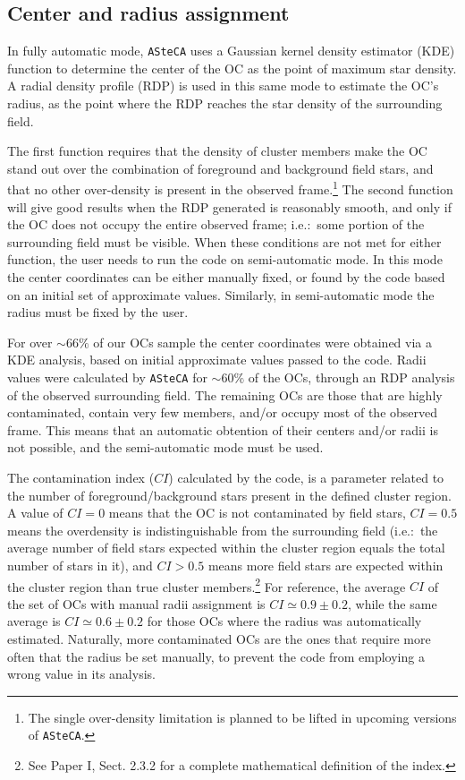 \documentclass{aa}
\begin{document}
\subsection{Center and radius assignment}
\label{ssec:centre-radius}

In fully automatic mode, \texttt{ASteCA} uses a Gaussian kernel density
estimator (KDE) function to determine the center of the OC as the point of
maximum star density.
A radial density profile (RDP) is used in this same mode to estimate
the OC's radius, as the point where the RDP reaches the star density of the
surrounding field.

The first function requires that the density of cluster members make the
OC stand out over the combination of foreground and background field stars, and
that no other over-density is present in the observed frame.\footnote{The single
over-density limitation is planned to be lifted in upcoming versions of
\texttt{ASteCA}.}
The second function will give good results when the RDP generated is reasonably
smooth, and only if the OC does not occupy the entire observed frame; i.e.:\
some portion of the surrounding field must be visible.
%
When these conditions are not met for either function, the user needs to run
the code on semi-automatic mode. In this mode the center coordinates can be
either manually fixed, or found by the code based on an initial set of
approximate values. Similarly, in semi-automatic mode the radius must be fixed
by the user.

For over ${\sim}66\%$ of our OCs sample the center coordinates were obtained
via a KDE analysis, based on initial approximate values passed to
the code. Radii values were calculated by \texttt{ASteCA} for ${\sim}60\%$ of
the OCs, through an RDP analysis of the observed surrounding field.
%
The remaining OCs are those that are highly contaminated, contain very
few members, and/or occupy most of the observed frame. This means that an
automatic obtention of their centers and/or radii is not possible, and the
semi-automatic mode must be used.

The contamination index ($CI$) calculated by the code, is a parameter related to
the number of foreground/background stars present in the defined cluster region.
A value of $CI{=}0$ means that the OC is not contaminated by field stars,
$CI{=}0.5$ means the overdensity is indistinguishable from the surrounding
field (i.e.:\ the average number of field stars expected within the cluster
region equals the total number of stars in it), and $CI{>}0.5$ means more field
stars are expected within the cluster region than true cluster
members.\footnote{See Paper I, Sect. 2.3.2 for a complete mathematical
definition of the index.}
%
For reference, the average $CI$ of the set of OCs with manual radii assignment
is $CI{\simeq}0.9{\pm}0.2$, while the same average is $CI{\simeq}0.6\pm0.2$ for
those OCs where the radius was automatically estimated. Naturally, more
contaminated OCs are the ones that require more often that the radius be set
manually, to prevent the code from employing a wrong value in its analysis.
\end{document}
